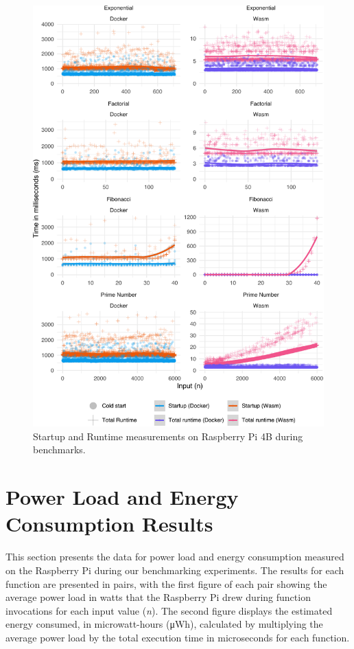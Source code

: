 \documentclass[
  table]{report}
\begin{document}
\begin{figure}[H]

{\centering \includegraphics{thesis_files/figure-latex/rpi-efficiency-1} 

}

\caption{Startup and Runtime measurements on Raspberry Pi 4B during benchmarks.}\label{fig:rpi-efficiency}
\end{figure}

\newpage

\section{Power Load and Energy Consumption Results}

This section presents the data for power load and energy consumption
measured on the Raspberry Pi during our benchmarking experiments. The
results for each function are presented in pairs, with the first figure
of each pair showing the average power load in watts that the Raspberry
Pi drew during function invocations for each input value (\emph{n}). The
second figure displays the estimated energy consumed, in microwatt-hours
(μWh), calculated by multiplying the average power load by the total
execution time in microseconds for each function.
\end{document}
